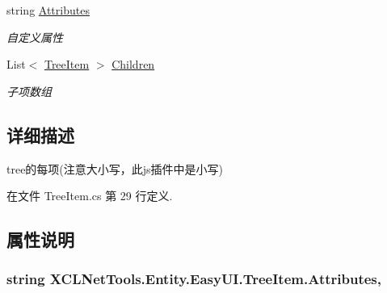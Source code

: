 \begin{DoxyCompactItemize}
string \hyperlink{class_x_c_l_net_tools_1_1_entity_1_1_easy_u_i_1_1_tree_item_a8f59dd785ca1acd2b70d5c159b711552}{Attributes}
\begin{DoxyCompactList}\small\item\em 自定义属性 \end{DoxyCompactList}\item 
List$<$ \hyperlink{class_x_c_l_net_tools_1_1_entity_1_1_easy_u_i_1_1_tree_item}{Tree\-Item} $>$ \hyperlink{class_x_c_l_net_tools_1_1_entity_1_1_easy_u_i_1_1_tree_item_a70ed6a7899043a9f8de3f28794ebd720}{Children}
\begin{DoxyCompactList}\small\item\em 子项数组 \end{DoxyCompactList}\end{DoxyCompactItemize}


\subsection{详细描述}
tree的每项(注意大小写，此js插件中是小写) 



在文件 Tree\-Item.\-cs 第 29 行定义.



\subsection{属性说明}
\hypertarget{class_x_c_l_net_tools_1_1_entity_1_1_easy_u_i_1_1_tree_item_a8f59dd785ca1acd2b70d5c159b711552}{
\subsubsection[{Attributes}]{\setlength{\rightskip}{0pt plus 5cm}string X\-C\-L\-Net\-Tools.\-Entity.\-Easy\-U\-I.\-Tree\-Item.\-Attributes\hspace{0.3cm}{\ttfamily [get]}, {\ttfamily [set]}}}\label{class_x_c_l_net_tools_1_1_entity_1_1_easy_u_i_1_1_tree_item_a8f59dd785ca1acd2b70d5c159b711552}


